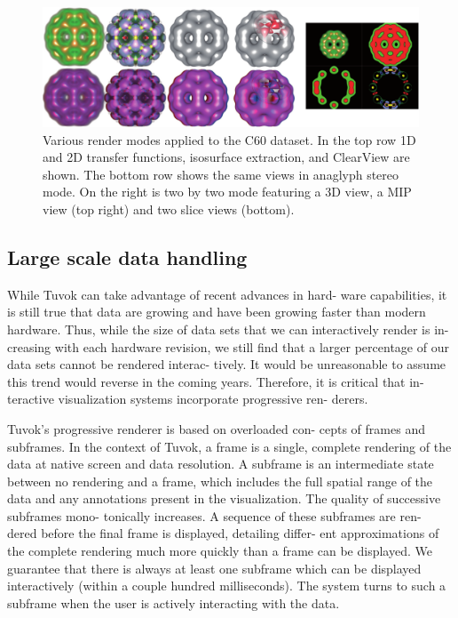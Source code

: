 \begin{figure}
	\includegraphics[width=\linewidth]{images/arch/c60modes}

  \caption{Various render modes applied to the C60 dataset.  In the
  top row 1D and 2D transfer functions, isosurface extraction, and
  ClearView are shown.  The bottom row shows the same views in anaglyph
  stereo mode.  On the right is two by two mode featuring a 3D view, a
  MIP view (top right) and two slice views (bottom).}
	\label{fig:modes}

\end{figure}

\subsection{Large scale data handling}

While Tuvok can take advantage of recent advances in hard-
ware capabilities, it is still true that data are growing and
have been growing faster than modern hardware. Thus, while
the size of data sets that we can interactively render is in-
creasing with each hardware revision, we still find that a
larger percentage of our data sets cannot be rendered interac-
tively. It would be unreasonable to assume this trend would
reverse in the coming years. Therefore, it is critical that in-
teractive visualization systems incorporate progressive ren-
derers.

Tuvok’s progressive renderer is based on overloaded con-
cepts of frames and subframes. In the context of Tuvok, a
frame is a single, complete rendering of the data at native
screen and data resolution. A subframe is an intermediate
state between no rendering and a frame, which includes the
full spatial range of the data and any annotations present in
the visualization. The quality of successive subframes mono-
tonically increases. A sequence of these subframes are ren-
dered before the final frame is displayed, detailing differ-
ent approximations of the complete rendering much more
quickly than a frame can be displayed. We guarantee that
there is always at least one subframe which can be displayed
interactively (within a couple hundred milliseconds). The
system turns to such a subframe when the user is actively
interacting with the data.

